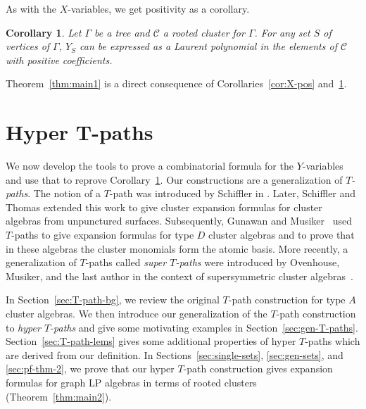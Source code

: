 \documentclass[pdftex]{sigma}
\numberwithin{equation}{section}
\newtheorem{Corollary}[Theorem]{Corollary}
\begin{document}
As with the $X$-variables, we get positivity as a corollary.

\begin{Corollary}\label{cor:Y-pos}
Let $\Gamma$ be a tree and $\mathcal{C}$ a rooted cluster for $\Gamma$. For any set $S$ of vertices of $\Gamma$, $Y_S$ can be expressed as a Laurent polynomial in the elements of $\mathcal{C}$ with positive coefficients.
\end{Corollary}

Theorem~\ref{thm:main1} is a direct consequence of Corollaries~\ref{cor:X-pos} and~\ref{cor:Y-pos}.

\section[Hyper T-paths]{Hyper $\boldsymbol{T}$-paths}\label{sec:T-path}

We now develop the tools to prove a combinatorial formula for the $Y$-variables and use that to reprove Corollary~\ref{cor:Y-pos}. Our constructions are a generalization of \emph{$T$-paths}.
The notion of a $T$-path was introduced by Schiffler in \cite{S-08}. Later, Schiffler and Thomas \cite{S-10, ST-09} extended this work to give cluster expansion formulas for cluster algebras from unpunctured surfaces. Subsequently, Gunawan and Musiker~\cite{GM-15} used $T$-paths to give expansion formulas for type $D$ cluster algebras and to prove that in these algebras the cluster monomials form the atomic basis. More recently, a generalization of $T$-paths called \emph{super $T$-paths} were introduced by Ovenhouse, Musiker, and the last author in the context of supersymmetric cluster algebras~\cite{MOZ-21}.

In Section~\ref{sec:T-path-bg}, we review the original $T$-path construction for type $A$ cluster algebras. We then introduce our generalization of the $T$-path construction to \emph{hyper $T$-paths}
and give some motivating examples in Section~\ref{sec:gen-T-paths}. Section~\ref{sec:T-path-lems} gives some additional properties of hyper $T$-paths which are derived from our definition. In Sections~\ref{sec:single-sets}, \ref{sec:gen-sets}, and \ref{sec:pf-thm-2}, we prove that our hyper $T$-path construction gives expansion formulas for graph LP algebras in terms of rooted clusters (Theorem~\ref{thm:main2}).
\end{document}
